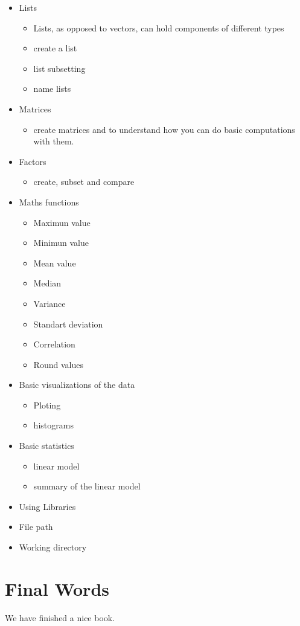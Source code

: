 \documentclass[]{book}
\providecommand{\tightlist}{%
  \setlength{\itemsep}{0pt}\setlength{\parskip}{0pt}}
\theoremstyle{definition}
\theoremstyle{definition}
\theoremstyle{definition}
\theoremstyle{remark}
\begin{document}
\begin{itemize}
\tightlist
\item
  Lists

  \begin{itemize}
  \tightlist
  \item
    Lists, as opposed to vectors, can hold components of different types
  \item
    create a list
  \item
    list subsetting
  \item
    name lists
  \end{itemize}
\item
  Matrices

  \begin{itemize}
  \tightlist
  \item
    create matrices and to understand how you can do basic computations
    with them.
  \end{itemize}
\item
  Factors

  \begin{itemize}
  \tightlist
  \item
    create, subset and compare
  \end{itemize}
\item
  Maths functions

  \begin{itemize}
  \tightlist
  \item
    Maximun value
  \item
    Minimun value
  \item
    Mean value
  \item
    Median
  \item
    Variance
  \item
    Standart deviation
  \item
    Correlation
  \item
    Round values
  \end{itemize}
\item
  Basic visualizations of the data

  \begin{itemize}
  \tightlist
  \item
    Ploting
  \item
    histograms
  \end{itemize}
\item
  Basic statistics

  \begin{itemize}
  \tightlist
  \item
    linear model
  \item
    summary of the linear model
  \end{itemize}
\item
  Using Libraries
\item
  File path
\item
  Working directory
\end{itemize}

\hypertarget{final-words}{%
\chapter{Final Words}\label{final-words}}

We have finished a nice book.


\end{document}
